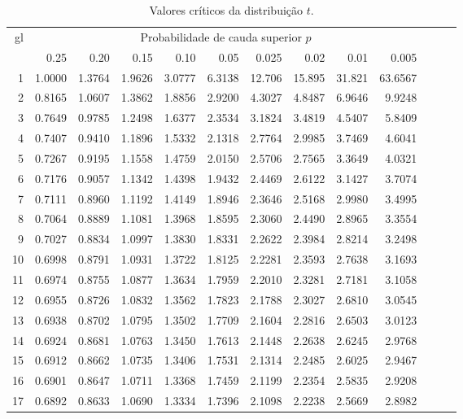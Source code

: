 \begin{table}[ht]
\vspace*{-10mm}
\centering
\caption{Valores críticos da distribuição $t$.}
\begin{tabular}{r||rrrrrrrrrrrr}
\hline
 \multirow{2}{*}{gl} & \multicolumn{9}{|c}{Probabilidade de cauda superior $p$} \\
  \cline{2-10}
 & 0.25 & 0.20 & 0.15 & 0.10 & 0.05 & 0.025 & 0.02 & 0.01 & 0.005 \\ 
\hline
1 & 1.0000 & 1.3764 & 1.9626 & 3.0777 & 6.3138 & 12.706 & 15.895 & 31.821 & 63.6567 \\ 
  2 & 0.8165 & 1.0607 & 1.3862 & 1.8856 & 2.9200 & 4.3027 & 4.8487 & 6.9646 & 9.9248 \\ 
  3 & 0.7649 & 0.9785 & 1.2498 & 1.6377 & 2.3534 & 3.1824 & 3.4819 & 4.5407 & 5.8409 \\ 
  4 & 0.7407 & 0.9410 & 1.1896 & 1.5332 & 2.1318 & 2.7764 & 2.9985 & 3.7469 & 4.6041 \\ 
  5 & 0.7267 & 0.9195 & 1.1558 & 1.4759 & 2.0150 & 2.5706 & 2.7565 & 3.3649 & 4.0321 \\ 
  6 & 0.7176 & 0.9057 & 1.1342 & 1.4398 & 1.9432 & 2.4469 & 2.6122 & 3.1427 & 3.7074 \\ 
  7 & 0.7111 & 0.8960 & 1.1192 & 1.4149 & 1.8946 & 2.3646 & 2.5168 & 2.9980 & 3.4995 \\ 
  8 & 0.7064 & 0.8889 & 1.1081 & 1.3968 & 1.8595 & 2.3060 & 2.4490 & 2.8965 & 3.3554 \\ 
  9 & 0.7027 & 0.8834 & 1.0997 & 1.3830 & 1.8331 & 2.2622 & 2.3984 & 2.8214 & 3.2498 \\ 
  10 & 0.6998 & 0.8791 & 1.0931 & 1.3722 & 1.8125 & 2.2281 & 2.3593 & 2.7638 & 3.1693 \\ 
  11 & 0.6974 & 0.8755 & 1.0877 & 1.3634 & 1.7959 & 2.2010 & 2.3281 & 2.7181 & 3.1058 \\ 
  12 & 0.6955 & 0.8726 & 1.0832 & 1.3562 & 1.7823 & 2.1788 & 2.3027 & 2.6810 & 3.0545 \\ 
  13 & 0.6938 & 0.8702 & 1.0795 & 1.3502 & 1.7709 & 2.1604 & 2.2816 & 2.6503 & 3.0123 \\ 
  14 & 0.6924 & 0.8681 & 1.0763 & 1.3450 & 1.7613 & 2.1448 & 2.2638 & 2.6245 & 2.9768 \\ 
  15 & 0.6912 & 0.8662 & 1.0735 & 1.3406 & 1.7531 & 2.1314 & 2.2485 & 2.6025 & 2.9467 \\ 
  16 & 0.6901 & 0.8647 & 1.0711 & 1.3368 & 1.7459 & 2.1199 & 2.2354 & 2.5835 & 2.9208 \\ 
  17 & 0.6892 & 0.8633 & 1.0690 & 1.3334 & 1.7396 & 2.1098 & 2.2238 & 2.5669 & 2.8982 \\ 

\end{tabular}
\end{table}
